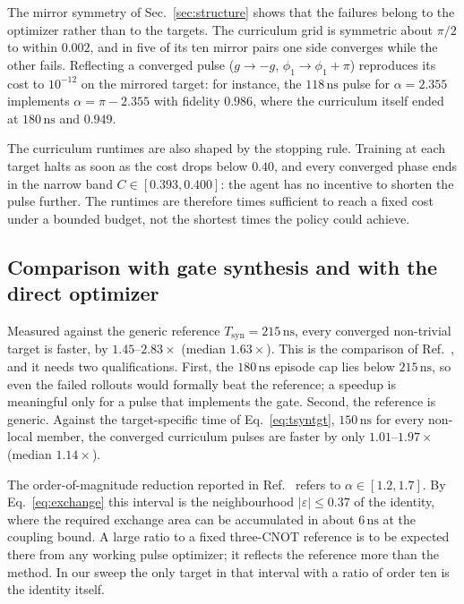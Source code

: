 \documentclass[aps,prx,twocolumn,superscriptaddress,nofootinbib,amsmath,amssymb,floatfix]{revtex4-2}
\newcommand{\Tsyn}{T_{\mathrm{syn}}}
\newcommand{\ns}{\,\mathrm{ns}}
\begin{document}
The mirror symmetry of Sec.~\ref{sec:structure} shows that the failures belong to the optimizer rather
than to the targets. The curriculum grid is symmetric about $\pi/2$ to within $0.002$, and in five of its
ten mirror pairs one side converges while the other fails. Reflecting a converged pulse ($g\to-g$,
$\phi_1\to\phi_1+\pi$) reproduces its cost to $10^{-12}$ on the mirrored target: for instance, the
$118\ns$ pulse for $\alpha=2.355$ implements $\alpha=\pi-2.355$ with fidelity $0.986$, where the
curriculum itself ended at $180\ns$ and $0.949$.

The curriculum runtimes are also shaped by the stopping rule. Training at each target halts as soon as
the cost drops below $0.40$, and every converged phase ends in the narrow band $C\in[0.393,0.400]$: the
agent has no incentive to shorten the pulse further. The runtimes are therefore times sufficient to reach
a fixed cost under a bounded budget, not the shortest times the policy could achieve.

\subsection{Comparison with gate synthesis and with the direct optimizer}
\label{sec:runtimecaveat}

Measured against the generic reference $\Tsyn=215\ns$, every converged non-trivial target is faster, by
$1.45$--$2.83\times$ (median $1.63\times$). This is the comparison of Ref.~\cite{Niu2019}, and it needs two
qualifications. First, the $180\ns$ episode cap lies below $215\ns$, so even the failed rollouts would
formally beat the reference; a speedup is meaningful only for a pulse that implements the gate. Second, the
reference is generic. Against the target-specific time of Eq.~\eqref{eq:tsyntgt}, $150\ns$ for every
non-local member, the converged curriculum pulses are faster by only $1.01$--$1.97\times$ (median
$1.14\times$).

The order-of-magnitude reduction reported in Ref.~\cite{Niu2019} refers to $\alpha\in[1.2,1.7]$. By
Eq.~\eqref{eq:exchange} this interval is the neighbourhood $|\varepsilon|\le0.37$ of the identity, where the
required exchange area can be accumulated in about $6\ns$ at the coupling bound. A large ratio to a fixed
three-CNOT reference is to be expected there from any working pulse optimizer; it reflects the reference
more than the method. In our sweep the only target in that interval with a ratio of order ten is the
identity itself.
\end{document}
